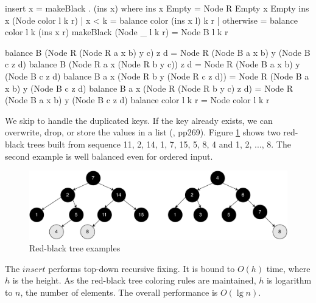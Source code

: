 \documentclass[b5paper]{article}
\begin{document}
\begin{Haskell}
insert x = makeBlack . (ins x) where
    ins x Empty = Node R Empty x Empty
    ins x (Node color l k r)
        | x < k     = balance color (ins x l) k r
        | otherwise = balance color l k (ins x r)
    makeBlack (Node _ l k r) = Node B l k r

balance B (Node R (Node R a x b) y c) z d = Node R (Node B a x b) y (Node B c z d)
balance B (Node R a x (Node R b y c)) z d = Node R (Node B a x b) y (Node B c z d)
balance B a x (Node R b y (Node R c z d)) = Node R (Node B a x b) y (Node B c z d)
balance B a x (Node R (Node R b y c) z d) = Node R (Node B a x b) y (Node B c z d)
balance color l k r = Node color l k r
\end{Haskell}

We skip to handle the duplicated keys. If the key already exists, we can overwrite, drop, or store the values in a list (\cite{CLRS}, pp269). Figure \cref{fig:insert-example} shows two red-black trees built from sequence 11, 2, 14, 1, 7, 15, 5, 8, 4 and 1, 2, ..., 8. The second example is well balanced even for ordered input.

\begin{figure}[htbp]
  \centering
  \includegraphics[scale=0.35]{img/insert-haskell}
  \caption{Red-black tree examples}
  \label{fig:insert-example}
\end{figure}

The $insert$ performs top-down recursive fixing. It is bound to $O(h)$ time, where $h$ is the height. As the red-black tree coloring rules are maintained, $h$ is logarithm to $n$, the number of elements. The overall performance is $O(\lg n)$.

\begin{Exercise}\label{ex:rbt-insert-wo-pm}
\end{Exercise}
\end{document}
